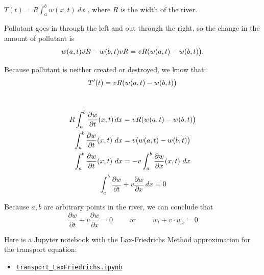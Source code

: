 \documentclass{workbook}
\begin{document}
\begin{solution}
\begin{slide}

\begin{parts}
	\item $\displaystyle T(t) = R \int_a^b w(x,t) ~dx$	, 	where $R$ is the width of the river.
	\item Pollutant goes in through the left and out through the right, so the change in the amount of pollutant is
	\[
	w(a,t) v R - w(b,t) v R = v R \bigskip(w(a,t) - w(b,t)\big).
	\]

	\item Because pollutant is neither created or destroyed, we know that:
	\[T'(t) = v R \bigskip(w(a,t) - w(b,t)\big) \]
	
	\begin{slidesonly}
	\vspace{3cm}
	\end{slidesonly}	
	
	\item \hfil \\[-35pt]
	\begin{align*}
		R \int_a^b \frac{\partial w}{ \partial t} (x,t) \, dx & = v R \bigskip(w(a,t) - w(b,t)\big) \\
		\int_a^b \frac{\partial w}{ \partial t} (x,t) ~dx & = v \bigskip(w(a,t) - w(b,t)\big) \\
		\int_a^b \frac{\partial w}{ \partial t} (x,t) ~dx & = -v \int_a^b \frac{\partial w}{\partial x} (x,t) ~dx
	\end{align*}
	\[
	\int_a^b \frac{\partial w}{ \partial t} + v \frac{\partial w}{ \partial x} ~dx = 0
	\]
	
	Because $a,b$ are arbitrary points in the river, we can conclude that
	\[ 
	\frac{\partial w}{ \partial t} + v \frac{\partial w}{ \partial x} = 0
	\qquad \text{ or } \qquad 
	w_t + v \cdot w_x = 0
	\]
	
\end{parts}

	Here is a Jupyter notebook with the Lax-Friedrichs Method approximation for the transport equation:
	\begin{itemize}
		\item \href{https://utoronto.syzygy.ca/jupyter/user-redirect/git-pull?repo=https://github.com/bigfatbernie/IBLMathModeling&subPath=python/transport_LaxFriedrichs.ipynb}{\tt transport\_LaxFriedrichs.ipynb}
	\end{itemize}
	
\end{slide}
	
\end{solution}
\end{document}
